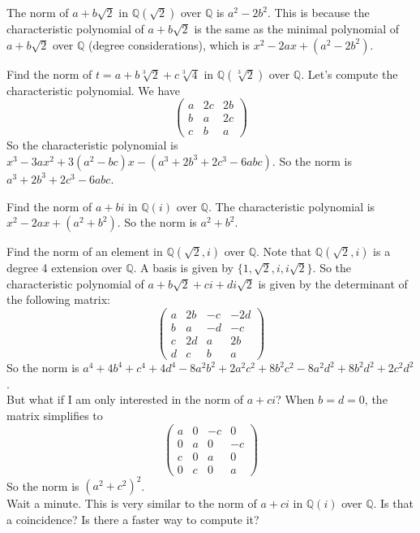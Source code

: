 \documentclass[15pt]{scrartcl}
\newcommand{\Q}{\mathbb{Q}}
\begin{document}
\begin{enumerate}
\begin{example}
    The norm of $a+b\sqrt{2}$ in $\Q(\sqrt{2})$ over $\Q$ is $a^2-2b^2$. This is because the characteristic polynomial of $a+b\sqrt{2}$ is the same as the minimal polynomial of $a+b\sqrt{2}$ over $\Q$ (degree considerations), which is $x^2-2ax+(a^2-2b^2)$. 
    \end{example} 
    \begin{example}
        Find the norm of $t=a+b\sqrt[3]{2}+c\sqrt[3]{4}$ in $\Q(\sqrt[3]{2})$ over $\Q$. Let's compute the characteristic polynomial. We have
\[\begin{pmatrix}
a & 2c & 2b \\
b & a & 2c \\
c & b & a
\end{pmatrix}\]
So the characteristic polynomial is $x^3-3ax^2+3(a^2-bc)x-(a^3+2b^3+2c^3-6abc)$. So the norm is $a^3+2b^3+2c^3-6abc$.
    \end{example}
    \begin{example}
        Find the norm of $a+b i$ in $\Q(i)$ over $\Q$. The characteristic polynomial is $x^2-2ax+(a^2+b^2)$. So the norm is $a^2+b^2$.
    \end{example}
    \begin{example}
        Find the norm of an element in $\Q(\sqrt{2},i)$ over $\Q$. Note that $\Q(\sqrt{2},i)$ is a degree 4 extension over $\Q$. A basis is given by $\{1,\sqrt{2},i,i\sqrt{2}\}$. So the characteristic polynomial of $a+b\sqrt{2}+ci+di\sqrt{2}$ is given by the determinant of the following matrix:
        \[\begin{pmatrix}
a & 2b & -c & -2d \\
b & a & -d & -c \\
c & 2d & a & 2b \\
d & c & b & a
\end{pmatrix}\]
So the norm is $a^4+4b^4+c^4+4d^4-8a^2b^2+2a^2c^2+8b^2c^2-8a^2d^2+8b^2d^2+2c^2d^2$. 
\\

But what if I am only interested in the norm of $a+ci$? When $b=d=0$, the matrix simplifies to
\[\begin{pmatrix}
a & 0 & -c & 0 \\
0 & a & 0 & -c \\
c & 0 & a & 0 \\
0 & c & 0 & a
\end{pmatrix}\]
So the norm is $(a^2+c^2)^2$.
\\
Wait a minute. This is very similar to the norm of $a+ci$ in $\Q(i)$ over $\Q$. Is that a coincidence? Is there a faster way to compute it?
\\


\end{example}
\end{enumerate}
\end{document}
